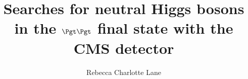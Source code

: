 \documentclass{mythesis}
\title{Searches for neutral Higgs bosons in the $\Pgt\Pgt$ final state with
the CMS detector}
\author{Rebecca Charlotte Lane}
\begin{document}
\begin{frontmatter}
  
\end{frontmatter}

\begin{mainmatter}
  
  
  
  
  
  
  
\end{mainmatter}

%  

\begin{backmatter}
  
\end{backmatter}

\end{document}
